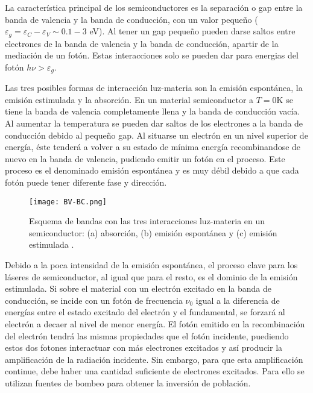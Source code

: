 \graphicspath{{./Introduccion/Figures/}}

La caracter\'istica principal de los semiconductores es la separaci\'on o gap entre la banda de valencia y la banda de conducci\'on, con un valor pequeño ($\varepsilon_g  = \varepsilon_C - \varepsilon_V \sim 0.1 - 3$ eV). Al tener un gap pequeño pueden darse saltos entre electrones de la banda de valencia y la banda de conducci\'on, apartir de la mediaci\'on de un fot\'on. Estas interacciones solo se pueden dar para energias del fot\'on $h\nu > \varepsilon_g$.

Las tres posibles formas de interacci\'on luz-materia son la emisi\'on espont\'anea, la emisi\'on estimulada y la absorci\'on. En un material semiconductor a $T = 0$K se tiene la banda de valencia completamente llena y la banda de conducci\'on vac\'ia. Al aumentar la temperatura se pueden dar saltos de los electrones a la banda de conducci\'on debido al pequeño gap. Al situarse un electr\'on en un nivel superior de energ\'ia, \'este tender\'a a volver a su estado de m\'inima energ\'ia recombinandose de nuevo en la banda de valencia, pudiendo emitir un fot\'on en el proceso. Este proceso es el denominado emisi\'on espont\'anea y es muy d\'ebil debido a que cada fot\'on puede tener diferente fase y direcci\'on.

	\begin{figure}[H]
		\centering
		\texttt{[image: BV-BC.png]}
		\caption{\label{Img:Saleh-BV-BC}Esquema de bandas con las tres interacciones luz-materia en un semiconductor: (a) absorci\'on, (b) emisi\'on espont\'anea y (c) emisi\'on estimulada \cite{saleh2019fundamentals}.}
	\end{figure}

Debido a la poca intensidad de la emisi\'on espont\'anea, el proceso clave para los l\'aseres de semiconductor, al igual que para el resto, es el dominio de la emisi\'on estimulada. Si sobre el material con un electr\'on excitado en la banda de conducci\'on, se incide con un fot\'on de frecuencia $\nu_0$ igual a la diferencia de energ\'ias entre el estado excitado del electr\'on y el fundamental, se forzar\'a al electr\'on a decaer al nivel de menor energ\'ia. El fot\'on emitido en la recombinaci\'on del electr\'on tendr\'a las mismas propiedades que el fot\'on incidente, puediendo estos dos fotones interactuar con m\'as electrones excitados y as\'i producir la amplificaci\'on de la radiaci\'on incidente. Sin embargo, para que esta amplificaci\'on continue, debe haber una cantidad suficiente de electrones excitados. Para ello se utilizan fuentes de bombeo para obtener la inversi\'on de poblaci\'on.

